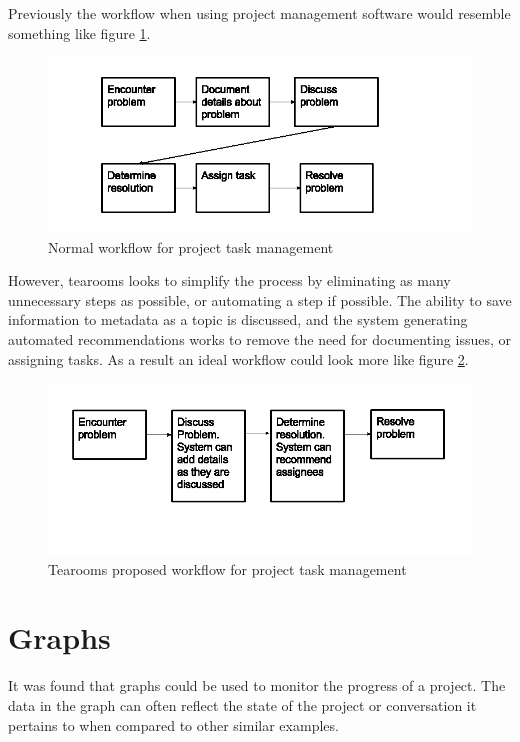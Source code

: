 \documentclass{l4proj}
\begin{document}
Previously the workflow when using project management software would resemble something like figure \ref{fig:1}.  


\begin{figure}[h]
\includegraphics[scale=0.75]{old-workflow.png}
\centering
\caption{Normal workflow for project task management}
\label{fig:1}
\end{figure}
\newpage

However, tearooms looks to simplify the process by eliminating as many unnecessary steps as possible, or automating a step if possible. The ability to save information to metadata as a topic is discussed, and the system generating automated recommendations works to remove the need for documenting issues, or assigning tasks.  As a result an ideal workflow could look more like figure \ref{fig:2}. 

\begin{figure}[h]
\includegraphics[scale=0.75]{New-workflow.png}
\centering
\caption{Tearooms proposed workflow for project task management}
\label{fig:2}
\end{figure}

\section{Graphs}

It was found that graphs could be used to monitor the progress of a project. The data in the graph can often reflect the state of the project or conversation it pertains to when compared to other similar examples.
\end{document}

